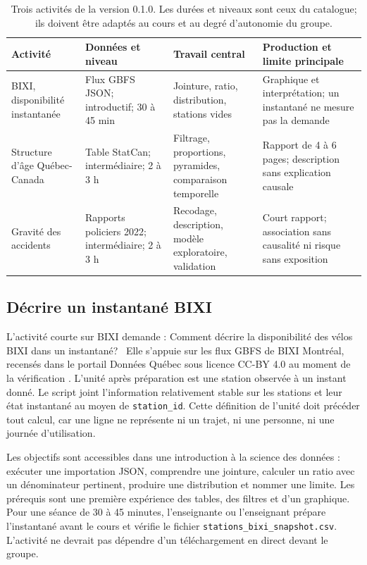 \begin{table}[ht]
\centering
\small
\begin{tabular}{p{2.8cm}p{3.2cm}p{3.2cm}p{3.2cm}}
\toprule
Activité & Données et niveau & Travail central & Production et limite principale \\
\midrule
BIXI, disponibilité instantanée & Flux GBFS JSON; introductif; 30 à 45 min & Jointure, ratio, distribution, stations vides & Graphique et interprétation; un instantané ne mesure pas la demande \\
\addlinespace
Structure d'âge Québec-Canada & Table StatCan; intermédiaire; 2 à 3 h & Filtrage, proportions, pyramides, comparaison temporelle & Rapport de 4 à 6 pages; description sans explication causale \\
\addlinespace
Gravité des accidents & Rapports policiers 2022; intermédiaire; 2 à 3 h & Recodage, description, modèle exploratoire, validation & Court rapport; association sans causalité ni risque sans exposition \\
\bottomrule
\end{tabular}
\caption{Trois activités de la version 0.1.0. Les durées et niveaux sont ceux du catalogue; ils doivent être adaptés au cours et au degré d'autonomie du groupe.}
\label{tab:activites}
\end{table}

\subsection{Décrire un instantané BIXI}

L'activité courte sur BIXI demande : \og Comment décrire la disponibilité des vélos BIXI dans un instantané? \fg~Elle s'appuie sur les flux GBFS de BIXI Montréal, recensés dans le portail Données Québec sous licence CC-BY 4.0 au moment de la vérification \cite{bixi}. L'unité après préparation est une station observée à un instant donné. Le script joint l'information relativement stable sur les stations et leur état instantané au moyen de \texttt{station\_id}. Cette définition de l'unité doit précéder tout calcul, car une ligne ne représente ni un trajet, ni une personne, ni une journée d'utilisation.

Les objectifs sont accessibles dans une introduction à la science des données : exécuter une importation JSON, comprendre une jointure, calculer un ratio avec un dénominateur pertinent, produire une distribution et nommer une limite. Les prérequis sont une première expérience des tables, des filtres et d'un graphique. Pour une séance de 30 à 45 minutes, l'enseignante ou l'enseignant prépare l'instantané avant le cours et vérifie le fichier \texttt{stations\_bixi\_snapshot.csv}. L'activité ne devrait pas dépendre d'un téléchargement en direct devant le groupe.

